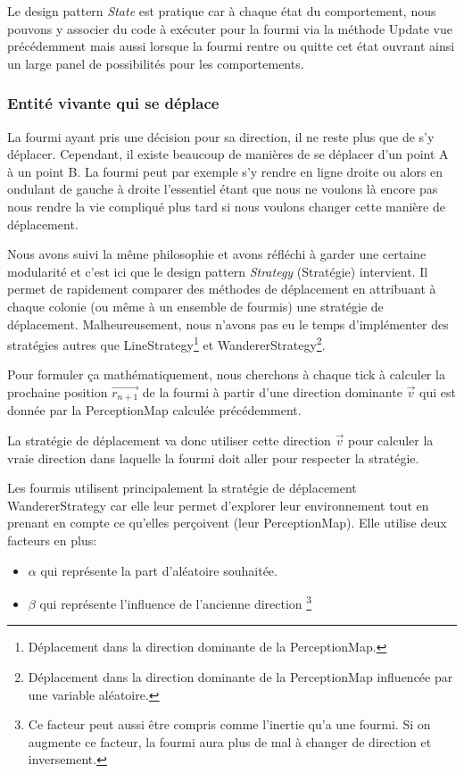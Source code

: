 \documentclass{EPUProjetDi}
\begin{document}
Le design pattern \textit{State} est pratique car à chaque état du comportement, nous pouvons y associer du code à exécuter pour la fourmi via la méthode 
Update vue précédemment mais aussi lorsque la fourmi rentre ou quitte cet état ouvrant ainsi un large panel de possibilités pour les comportements. 

\subsubsection{Entité vivante qui se déplace}

La fourmi ayant pris une décision pour sa direction, il ne reste plus que de s'y déplacer. Cependant, il existe beaucoup de manières de se déplacer
d'un point A à un point B. La fourmi peut par exemple s'y rendre en ligne droite ou alors en ondulant de gauche à droite l'essentiel étant que nous
ne voulons là encore pas nous rendre la vie compliqué plus tard si nous voulons changer cette manière de déplacement.

Nous avons suivi la même philosophie et avons réfléchi à garder une certaine modularité et c'est ici que le design pattern 
\textit{Strategy} (Stratégie) intervient. Il permet de rapidement comparer des méthodes de déplacement en attribuant à chaque colonie 
(ou même à un ensemble de fourmis) une stratégie de déplacement.
Malheureusement, nous n'avons pas eu le temps d'implémenter des stratégies autres que LineStrategy\footnote{Déplacement dans la direction dominante de la PerceptionMap.} 
et WandererStrategy\footnote{Déplacement dans la direction dominante de la PerceptionMap influencée par une variable aléatoire.}.

Pour formuler ça mathématiquement, nous cherchons à chaque tick à calculer la prochaine position $\vec{r_{n+1}}$ de la fourmi à partir
d'une direction dominante $\vec{v}$ qui est donnée par la PerceptionMap calculée précédemment.

La stratégie de déplacement va donc utiliser cette direction $\vec{v}$ pour calculer la vraie direction dans laquelle la fourmi doit aller 
pour respecter la stratégie.

Les fourmis utilisent principalement la stratégie de déplacement WandererStrategy car elle leur permet d'explorer leur environnement tout en prenant
en compte ce qu'elles perçoivent (leur PerceptionMap). Elle utilise deux facteurs en plus: 
\begin{itemize}
    \item $\alpha$ qui représente la part d'aléatoire souhaitée.
    \item $\beta$ qui représente l'influence de l'ancienne direction \footnote{Ce facteur peut aussi être compris comme l'inertie qu'a une fourmi.
    Si on augmente ce facteur, la fourmi aura plus de mal à changer de direction et inversement.}
\end{itemize}
\end{document}
